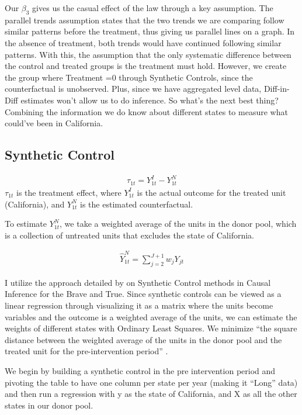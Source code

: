 \documentclass[12pt]{article}
\begin{document}
    Our $\beta_3$ gives us the casual effect of the law through a key assumption. The parallel trends assumption states that the two trends we are comparing follow similar patterns before the treatment, thus giving us parallel lines on a graph. In the absence of treatment, both trends would have continued following similar patterns. With this, the assumption that the only systematic difference between the control and treated groups is the treatment must hold. However, we create the group where Treatment =0 through Synthetic Controls, since the counterfactual is unobserved. Plus, since we have aggregated level data, Diff-in-Diff estimates won’t allow us to do inference. So what’s the next best thing? Combining the information we do know about different states to measure what could’ve been in California.

\subsection{Synthetic Control}
\begin{align*}
\tau_{1t} = Y^{I}_{1t} - Y^{N}_{1t}
\end{align*}
\noindent
$\tau_{1t}$ is the treatment effect, where $Y^{I}_{1t}$ is the actual outcome for the treated unit (California), and $Y^{N}_{1t}$ is the estimated counterfactual.
\vspace{1em}

To estimate $Y^{N}_{1t}$, we take a weighted average of the units in the donor pool, which is a collection of untreated units that excludes the state of California.

\begin{align*}
\hat{Y}^{N}_{1t} = \sum_{j=2}^{J+1} w_j Y_{jt}
\end{align*}

    I utilize the approach detailed by \cite{facure2025} on Synthetic Control methods in Causal Inference for the Brave and True. Since synthetic controls can be viewed as a linear regression through visualizing it as a matrix where the units become variables and the outcome is a weighted average of the units, we can estimate the weights of different states with Ordinary Least Squares. We minimize “the square distance between the weighted average of the units in the donor pool and the treated unit for the pre-intervention period” \parencite{facure2025}.

    We begin by building a synthetic control in the pre intervention period and pivoting the table to have one column per state per year (making it “Long” data) and then run a regression with y as the state of California, and X as all the other states in our donor pool. 
\end{document}
